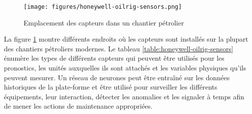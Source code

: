 \begin{figure}[p!]
	\centering
	\texttt{[image: figures/honeywell-oilrig-sensors.png]}
	\caption{Emplacement des capteurs dans un chantier pétrolier \cite{honeywellrig}}%
	\label{fig:honeywell-oilrig-sensors}
\end{figure}

La figure \ref{fig:honeywell-oilrig-sensors} montre différents endroits où les capteurs sont installés sur la plupart des chantiers pétroliers modernes. Le tableau \ref{table:honeywell-oilrig-sensors} énumère les types de différents capteurs qui peuvent être utilisés pour les pronostics, les unités auxquelles ils sont attachés et les variables physiques qu'ils peuvent mesurer. Un réseau de neurones peut être entraîné sur les données historiques de la plate-forme et être utilisé pour surveiller les différents équipements, leur interaction, détecter les anomalies et les signaler à temps afin de mener les actions de maintenance appropriées.

